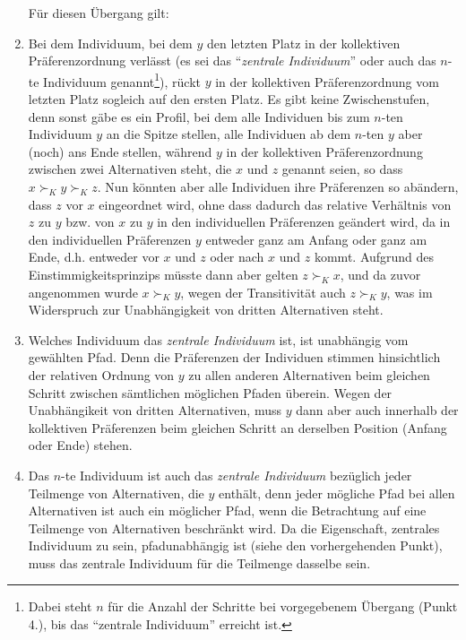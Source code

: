 \begin{enumerate}
  Für diesen Übergang gilt:
 
  \item Bei dem Individuum, bei dem $y$ den letzten Platz in der kollektiven
  Präferenzordnung verlässt (es sei das "`{\em zentrale Individuum}"' oder auch
  das $n$-te Individuum genannt\footnote{Dabei steht $n$ für die Anzahl der
  Schritte bei vorgegebenem Übergang (Punkt 4.), bis das "`zentrale Individuum"'
  erreicht ist.}), rückt $y$ in der kollektiven Präferenzordnung vom letzten
  Platz sogleich auf den ersten Platz. Es gibt keine Zwischenstufen, denn sonst
  gäbe es ein Profil, bei dem alle Individuen bis zum $n$-ten Individuum $y$ an
  die Spitze stellen, alle Individuen ab dem $n$-ten $y$ aber (noch) ans Ende
  stellen, während $y$ in der kollektiven Präferenzordnung zwischen zwei
  Alternativen steht, die $x$ und $z$ genannt seien, so dass $x \succ_K y \succ_K
  z$. Nun könnten aber alle Individuen ihre Präferenzen so abändern, dass $z$ vor
  $x$ eingeordnet wird, ohne dass dadurch das relative Verhältnis von $z$ zu $y$
  bzw. von $x$ zu $y$ in den individuellen Präferenzen geändert wird, da in den
  individuellen Präferenzen $y$ entweder ganz am Anfang oder ganz am Ende, d.h.
  entweder vor $x$ und $z$ oder nach $x$ und $z$ kommt. Aufgrund des
  Einstimmigkeitsprinzips müsste dann aber gelten $z \succ_K x$, und da zuvor
  angenommen wurde $x \succ_K y$, wegen der Transitivität auch $z \succ_K y$, was
  im Widerspruch zur Unabhängigkeit von dritten Alternativen steht.
  
  \item Welches Individuum das {\em zentrale Individuum} ist, ist unabhängig vom
  gewählten Pfad. Denn die Präferenzen der Individuen stimmen hinsichtlich der
  relativen Ordnung von $y$ zu allen anderen Alternativen beim gleichen Schritt
  zwischen sämtlichen möglichen Pfaden überein. Wegen der Unabhängikeit von
  dritten Alternativen, muss $y$ dann aber auch innerhalb der kollektiven
  Präferenzen beim gleichen Schritt an derselben Position (Anfang oder Ende)
  stehen.
  
  \item Das $n$-te Individuum ist auch das {\em zentrale Individuum} bezüglich
  jeder Teilmenge von Alternativen, die $y$ enthält, denn jeder mögliche Pfad bei
  allen Alternativen ist auch ein möglicher Pfad, wenn die Betrachtung auf eine
  Teilmenge von Alternativen beschränkt wird. Da die Eigenschaft, zentrales
  Individuum zu sein, pfadunabhängig ist (siehe den vorhergehenden Punkt), muss
  das zentrale Individuum für die Teilmenge dasselbe sein.
\end{enumerate}


